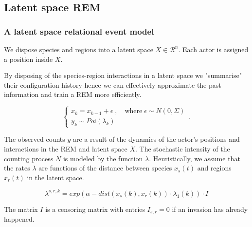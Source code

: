 \documentclass[
	11pt, %
]{beamer}
\begin{document}
\subsection{Latent space REM}
\begin{frame}
	\frametitle{A latent space relational event model}
	We dispose species and regions into a latent space $X \in \mathcal{R}^n$. Each actor is assigned a position inside $X$.
	
	\bigskip
	
	By disposing of the species-region interactions in a latent space we "summarise" their configuration history hence we can effectively approximate the past information and train a REM more efficiently.
	
\bigskip
\begin{equation*}
    \begin{cases}
      x_k = x_{k-1} + \epsilon \; , \quad \textrm{where} \; \epsilon \sim N(0, \Sigma) \\
      y_k \sim Poi(\lambda_k) \;
    \end{cases}\,.
\end{equation*}

\end{frame}


\begin{frame}
The observed counts $y$ are a result of the dynamics of the actor's positions and interactions in the REM and latent space $X$. The stochastic intensity of the counting process $N$ is modeled by the function $\lambda$. Heuristically, we assume that the rates $\lambda$ are functions of the distance between species $x_s(t)$ and regions $x_r(t)$ in the latent space. 

\bigskip

\[ \lambda^{s, r, k} = exp\left(\alpha-dist(x_s(k), x_r(k)) \cdot \lambda_1(k) \right) \cdot I \]

\bigskip

The matrix $I$ is a censoring matrix with entries $I_{s,r} = 0$ if an invasion has already happened.

\end{frame}
\end{document}
